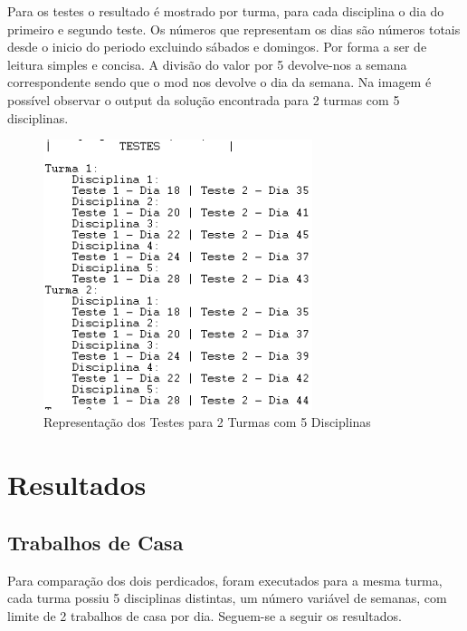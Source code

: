 \documentclass{llncs}
\begin{document}
Para os testes o resultado é mostrado por turma, para cada disciplina o dia do primeiro e segundo teste. Os números que representam os dias são números totais desde o inicio do periodo excluindo sábados e domingos. Por forma a ser de leitura simples e concisa. A divisão do valor por 5 devolve-nos a semana correspondente sendo que o mod nos devolve o  dia da semana.
Na imagem é possível observar o output da solução encontrada para 2 turmas com 5 disciplinas.
\begin{figure}
\centering
\includegraphics[width=0.7\textwidth]{testes}
\caption{Representação dos Testes para 2 Turmas com 5 Disciplinas}
\end{figure}
\FloatBarrier

\section{Resultados}

\subsection{ Trabalhos de Casa}

Para comparação dos dois perdicados, foram executados para a mesma turma, cada turma possiu 5 disciplinas distintas, um número variável de semanas, com limite de 2 trabalhos de casa por dia. Seguem-se a seguir os resultados.
\end{document}

